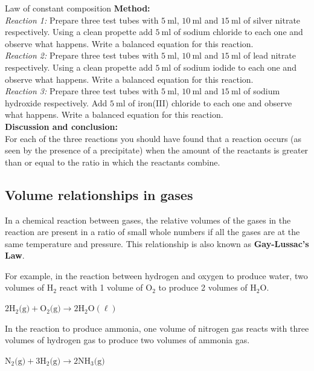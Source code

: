 \begin{Investigation}{Law of constant composition}
\textbf{Method:}\\
\textsl{Reaction 1:} Prepare three test tubes with $5~\text{ml}$, $10~\text{ml}$ and $15~\text{ml}$  of silver nitrate respectively. Using a clean propette add $5~\text{ml}$ of sodium chloride to each one and observe what happens. Write a balanced equation for this reaction.\\
\textsl{Reaction 2:} Prepare three test tubes with $5~\text{ml}$, $10~\text{ml}$ and $15~\text{ml}$  of lead nitrate respectively. Using a clean propette add $5~\text{ml}$ of sodium iodide to each one and observe what happens. Write a balanced equation for this reaction.\\
\textsl{Reaction 3:} Prepare three test tubes with $5~\text{ml}$, $10~\text{ml}$ and $15~\text{ml}$  of sodium hydroxide respectively. Add $5~\text{ml}$ of iron(III) chloride to each one and observe what happens. Write a balanced equation for this reaction. \\
\textbf{Discussion and conclusion:} \\
For each of the three reactions you should have found that a reaction occurs (as seen by the presence of a precipitate) when the amount of the reactants is greater than or equal to the ratio in which the reactants combine.  
\end{Investigation}

    \label{m38711*cid7}
            \subsection*{Volume relationships in gases}
            \nopagebreak
      \label{m38711*id65179}In a chemical reaction between gases, the relative volumes of the gases in the reaction are present in a ratio of small whole numbers if all the gases are at the same temperature and pressure. This relationship is also known as \textbf{Gay-Lussac's Law}.\par 
      \label{m38711*id65189}For example, in the reaction between hydrogen and oxygen to produce water, two volumes of $\text{H}{}_{2}$ react with 1 volume of $\text{O}_{2}$ to produce 2 volumes of $\text{H}_{2}\text{O}$.\par 
      \label{m38711*id65237}$2\text{H}_{2}\text{(g)} +\text{O}_{2} \text{(g)} \to 2\text{H}_{2}\text{O} (\ell)$\par 
      \label{m38711*id65282}In the reaction to produce ammonia, one volume of nitrogen gas reacts with three volumes of hydrogen gas to produce two volumes of ammonia gas.\par 
      \label{m38711*id65286}$\text{N}_{2} \text{(g)}+3\text{H}_{2} \text{(g)} \to 2\text{NH}_{3} \text{(g)}$
      \par  
    \label{m38711*cid8}
